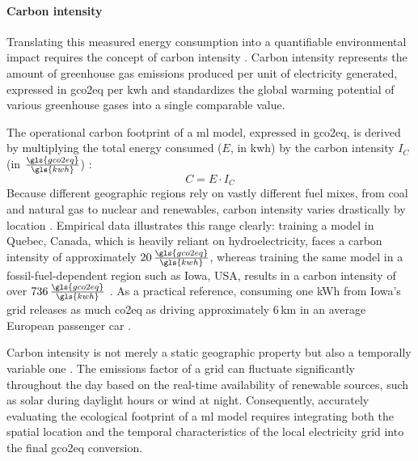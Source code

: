\paragraph{Carbon intensity}
Translating this measured energy consumption into a quantifiable environmental impact requires the concept of carbon intensity \parencite{lacosteQuantifyingCarbonEmissions2019}. Carbon intensity represents the amount of greenhouse gas emissions produced per unit of electricity generated, expressed in \gls{gco2eq} per \gls{kwh} and standardizes the global warming potential of various greenhouse gases into a single comparable value.

The operational carbon footprint of a \gls{ml} model, expressed in \gls{gco2eq}, is derived by multiplying the total energy consumed ($E$, in \gls{kwh}) by the carbon intensity $I_C$ (in $\frac{\gls{gco2eq}}{\gls{kwh}}$) \parencite{dodgeMeasuringCarbonIntensity2022}:
\begin{equation}
    C = E \cdot I_C
    \label{eq:carbon_footprint}
\end{equation} Because different geographic regions rely on vastly different fuel mixes, from coal and natural gas to nuclear and renewables, carbon intensity varies drastically by location \parencite{hendersonSystematicReportingEnergy2020}. Empirical data illustrates this range clearly: training a model in Quebec, Canada, which is heavily reliant on hydroelectricity, faces a carbon intensity of approximately $20\,\frac{\gls{gco2eq}}{\gls{kwh}}$, whereas training the same model in a fossil-fuel-dependent region such as Iowa, USA, results in a carbon intensity of over $736\,\frac{\gls{gco2eq}}{\gls{kwh}}$ \parencite{lacosteQuantifyingCarbonEmissions2019}. As a practical reference, consuming one kWh from Iowa's grid releases as much \gls{co2eq} as driving approximately 6\,km in an average European passenger car \parencite{europeanenvironmentagencyMonitoringCO2Emissions2025}.

Carbon intensity is not merely a static geographic property but also a temporally variable one \parencite{dodgeMeasuringCarbonIntensity2022}. The emissions factor of a grid can fluctuate significantly throughout the day based on the real-time availability of renewable sources, such as solar during daylight hours or wind at night. Consequently, accurately evaluating the ecological footprint of a \gls{ml} model requires integrating both the spatial location and the temporal characteristics of the local electricity grid into the final \gls{gco2eq} conversion.


